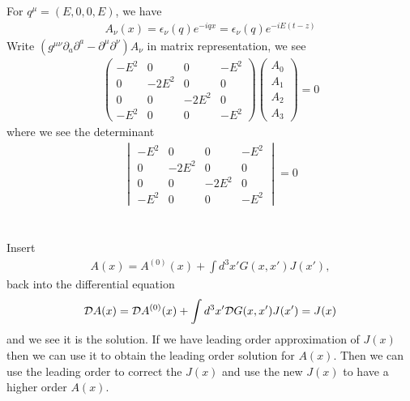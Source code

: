 \documentclass[11pt]{article}
\def\del{{\partial}}
\begin{document}
\section{ }
For $q^\mu = (E,0,0,E)$, we have 
\begin{eqnarray}
    A_\nu(x) = \epsilon_\nu(q) e^{-iqx} = \epsilon_\nu(q) e^{-iE(t-z)}
\end{eqnarray}
Write $(g^{\mu\nu} \del_a \del^a -\del^\mu \del^\nu) A_\nu$ in matrix representation, we see
\begin{eqnarray}
    \begin{pmatrix}
        -E^2 & 0 & 0 & -E^2 \\
        0 & -2E^2& 0 & 0 \\
        0 & 0 & -2E^2& 0 \\
        -E^2 & 0 & 0 & -E^2
    \end{pmatrix}
    \begin{pmatrix}
        A_0 \\ A_1 \\ A_2 \\ A_3
    \end{pmatrix}
    =0
\end{eqnarray}
where we see the determinant
\begin{eqnarray}
    \begin{vmatrix}
        -E^2 & 0 & 0 & -E^2 \\
        0 & -2E^2& 0 & 0 \\
        0 & 0 & -2E^2& 0 \\
        -E^2 & 0 & 0 & -E^2
    \end{vmatrix}
    =0
\end{eqnarray}

\section{ }
Insert
\begin{eqnarray}
    A(x) = A^{(0)}(x) + \int d^3x' G(x,x') J(x'),
\end{eqnarray}
back into the differential equation
\begin{eqnarray}
    {\cal D} A(x)= {\cal D} A^{(0)}(x) + \int d^3x' {\cal D} G(x,x') J(x') = J(x)
\end{eqnarray}
and we see it is the solution. If we have leading order approximation of $J(x)$ then we can use it to obtain the leading order solution for $A(x)$. Then we can use the leading order to correct the $J(x)$ and use the new $J(x)$ to have a higher order $A(x)$.
\end{document}
